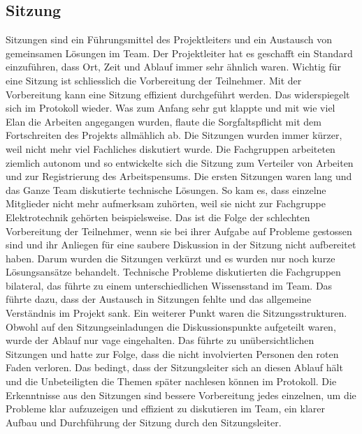 \subsection{Sitzung}
Sitzungen sind ein Führungsmittel des Projektleiters und ein Austausch von gemeinsamen Lösungen im Team. Der Projektleiter hat es geschafft ein Standard einzuführen, dass Ort, Zeit und Ablauf immer sehr ähnlich waren. Wichtig für eine Sitzung ist schliesslich die Vorbereitung der Teilnehmer. Mit der Vorbereitung kann eine Sitzung effizient durchgeführt werden. Das widerspiegelt sich im Protokoll wieder. Was zum Anfang sehr gut klappte und mit wie viel Elan die Arbeiten angegangen wurden, flaute die Sorgfaltspflicht mit dem Fortschreiten des Projekts allmählich ab. Die Sitzungen wurden immer kürzer, weil nicht mehr viel Fachliches diskutiert wurde. Die Fachgruppen arbeiteten ziemlich autonom und so entwickelte sich die Sitzung zum Verteiler von Arbeiten und zur Registrierung des Arbeitspensums. Die ersten Sitzungen waren lang und das Ganze Team diskutierte technische Lösungen. So kam es, dass einzelne Mitglieder nicht mehr aufmerksam zuhörten, weil sie nicht zur Fachgruppe Elektrotechnik gehörten beispielsweise. Das ist die Folge der schlechten Vorbereitung der Teilnehmer, wenn sie bei ihrer Aufgabe auf Probleme gestossen sind und ihr Anliegen für eine saubere Diskussion in der Sitzung nicht aufbereitet haben. Darum wurden die Sitzungen verkürzt und es wurden nur noch kurze Lösungsansätze behandelt. Technische Probleme diskutierten die Fachgruppen bilateral, das führte zu einem unterschiedlichen Wissensstand im Team. Das führte dazu, dass der Austausch in Sitzungen fehlte und das allgemeine Verständnis im Projekt sank. Ein weiterer Punkt waren die Sitzungsstrukturen. Obwohl auf den Sitzungseinladungen die Diskussionspunkte aufgeteilt waren, wurde der Ablauf nur vage eingehalten. Das führte zu unübersichtlichen Sitzungen und hatte zur Folge, dass die nicht involvierten Personen den roten Faden verloren. Das bedingt, dass der Sitzungsleiter sich an diesen Ablauf hält und die Unbeteiligten die Themen später nachlesen können im Protokoll.
Die Erkenntnisse aus den Sitzungen sind bessere Vorbereitung jedes einzelnen, um die Probleme klar aufzuzeigen und effizient zu diskutieren im Team, ein klarer Aufbau und Durchführung der Sitzung durch den Sitzungsleiter.